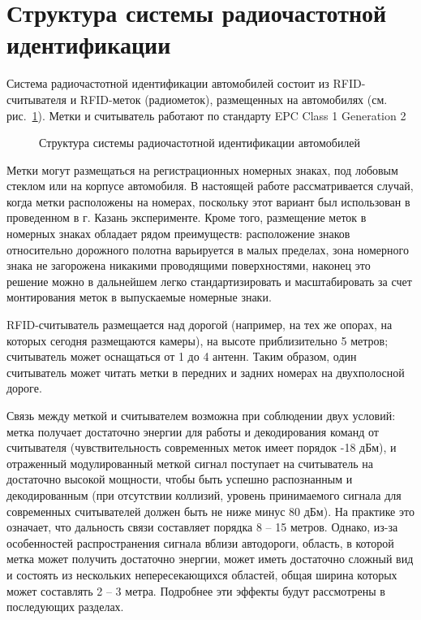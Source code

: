 \section{Структура системы радиочастотной идентификации} \label{sec:ch2_structure}
Система радиочастотной идентификации автомобилей состоит из RFID-считывателя и RFID-меток (радиометок), размещенных на автомобилях (см. рис.~\ref{fig:ch2_system_structure}). Метки и считыватель работают по стандарту EPC Class 1 Generation 2 \cite{StdGen2}

\begin{figure}[ht] 
  \caption{Структура системы радиочастотной идентификации автомобилей}
  \label{fig:ch2_system_structure}
\end{figure}

Метки могут размещаться на регистрационных номерных знаках, под лобовым стеклом или на корпусе автомобиля. В настоящей работе рассматривается случай, когда метки расположены на номерах, поскольку этот вариант был использован в проведенном в г. Казань эксперименте. Кроме того, размещение меток в номерных знаках обладает рядом преимуществ: расположение знаков относительно дорожного полотна варьируется в малых пределах, зона номерного знака не загорожена никакими проводящими поверхностями, наконец это решение можно в дальнейшем легко стандартизировать и масштабировать за счет монтирования меток в выпускаемые номерные знаки.

RFID-считыватель размещается над дорогой (например, на тех же опорах, на которых сегодня размещаются камеры), на высоте приблизительно 5 метров; считыватель может оснащаться от 1 до 4 антенн. Таким образом, один считыватель может читать метки в передних и задних номерах на двухполосной дороге.

Связь между меткой и считывателем возможна при соблюдении двух условий: метка получает достаточно энергии для работы и декодирования команд от считывателя (чувствительность современных меток имеет порядок -18 дБм), и отраженный модулированный меткой сигнал поступает на считыватель на достаточно высокой мощности, чтобы быть успешно распознанным и декодированным (при отсутствии коллизий, уровень принимаемого сигнала для современных считывателей должен быть не ниже минус 80 дБм). На практике это означает, что дальность связи составляет порядка 8 -- 15 метров. Однако, из-за особенностей распространения сигнала вблизи автодороги, область, в которой метка может получить достаточно энергии, может иметь достаточно сложный вид и состоять из нескольких непересекающихся областей, общая ширина которых может составлять 2 -- 3 метра. Подробнее эти эффекты будут рассмотрены в последующих разделах.




